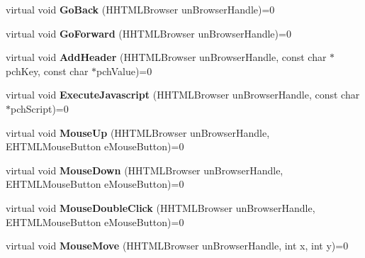 \begin{DoxyCompactItemize}
\item 
\mbox{\label{class_i_steam_h_t_m_l_surface_a70870c78a35e0916c1b9dd1240d15996}} 
virtual void {\bfseries Go\+Back} (H\+H\+T\+M\+L\+Browser un\+Browser\+Handle)=0
\item 
\mbox{\label{class_i_steam_h_t_m_l_surface_aac6ff06787667a32fceb04985d6c486c}} 
virtual void {\bfseries Go\+Forward} (H\+H\+T\+M\+L\+Browser un\+Browser\+Handle)=0
\item 
\mbox{\label{class_i_steam_h_t_m_l_surface_aef7bc3d2ce1fd82c02f6a89e78266095}} 
virtual void {\bfseries Add\+Header} (H\+H\+T\+M\+L\+Browser un\+Browser\+Handle, const char $\ast$pch\+Key, const char $\ast$pch\+Value)=0
\item 
\mbox{\label{class_i_steam_h_t_m_l_surface_a6bdc98a34ff569232f6668dadb0648a6}} 
virtual void {\bfseries Execute\+Javascript} (H\+H\+T\+M\+L\+Browser un\+Browser\+Handle, const char $\ast$pch\+Script)=0
\item 
\mbox{\label{class_i_steam_h_t_m_l_surface_a724ad6ccdbb026c08c14fd534ef658cf}} 
virtual void {\bfseries Mouse\+Up} (H\+H\+T\+M\+L\+Browser un\+Browser\+Handle, E\+H\+T\+M\+L\+Mouse\+Button e\+Mouse\+Button)=0
\item 
\mbox{\label{class_i_steam_h_t_m_l_surface_ae3956fc0d0c5994e5912c540ebc1bc81}} 
virtual void {\bfseries Mouse\+Down} (H\+H\+T\+M\+L\+Browser un\+Browser\+Handle, E\+H\+T\+M\+L\+Mouse\+Button e\+Mouse\+Button)=0
\item 
\mbox{\label{class_i_steam_h_t_m_l_surface_ac03609b36de485199a10db0b3e10437e}} 
virtual void {\bfseries Mouse\+Double\+Click} (H\+H\+T\+M\+L\+Browser un\+Browser\+Handle, E\+H\+T\+M\+L\+Mouse\+Button e\+Mouse\+Button)=0
\item 
\mbox{\label{class_i_steam_h_t_m_l_surface_adcfad4756dd83a4301ebebffa4f72572}} 
virtual void {\bfseries Mouse\+Move} (H\+H\+T\+M\+L\+Browser un\+Browser\+Handle, int x, int y)=0
\item 

\end{DoxyCompactItemize}

